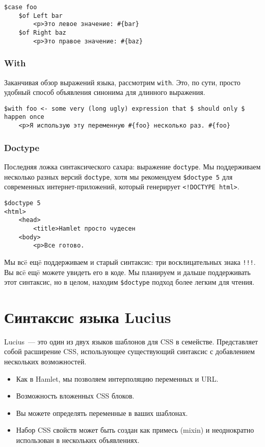\begin{lstlisting}
$case foo
    $of Left bar
        <p>Это левое значение: #{bar}
    $of Right baz
        <p>Это правое значение: #{baz}
\end{lstlisting}

\subsubsection{With}

Заканчивая обзор выражений языка, рассмотрим \lstinline'with'. Это, по сути,
просто удобный способ объявления синонима для длинного выражения.

\begin{lstlisting}
$with foo <- some very (long ugly) expression that $ should only $ happen once
    <p>Я использую эту переменную #{foo} несколько раз. #{foo}
\end{lstlisting}

\subsubsection{Doctype}
Последняя ложка синтаксического сахара: выражение \lstinline'doctype'. Мы
поддерживаем несколько разных версий \lstinline'doctype', хотя мы рекомендуем
\lstinline!$doctype 5! для современных интернет-приложений, который генерирует
\lstinline'<!DOCTYPE html>'.

\begin{lstlisting}
$doctype 5
<html>
    <head>
        <title>Hamlet просто чудесен
    <body>
        <p>Все готово.
\end{lstlisting}

\begin{remark}
    Мы всë ещë поддерживаем и старый синтаксис: три восклицательных знака
    \lstinline'!!!'.  Вы всë ещë можете увидеть его в коде. Мы планируем и дальше
    поддерживать этот синтаксис, но в целом, находим \lstinline!$doctype!
    подход более легким для чтения.
\end{remark}

\section{Синтаксис языка Lucius}

Lucius~--- это один из двух языков шаблонов для CSS в семействе. Представляет
собой расширение CSS, использующее существующий синтаксис с добавлением
нескольких возможностей.

\begin{itemize}
    \item Как в Hamlet, мы позволяем интерполяцию переменных и URL.
    \item Возможность вложенных CSS блоков.
    \item Вы можете определять переменные в ваших шаблонах.
    \item Набор CSS свойств может быть создан как примесь (mixin) и
        неоднократно использован в нескольких объявлениях.
\end{itemize}

